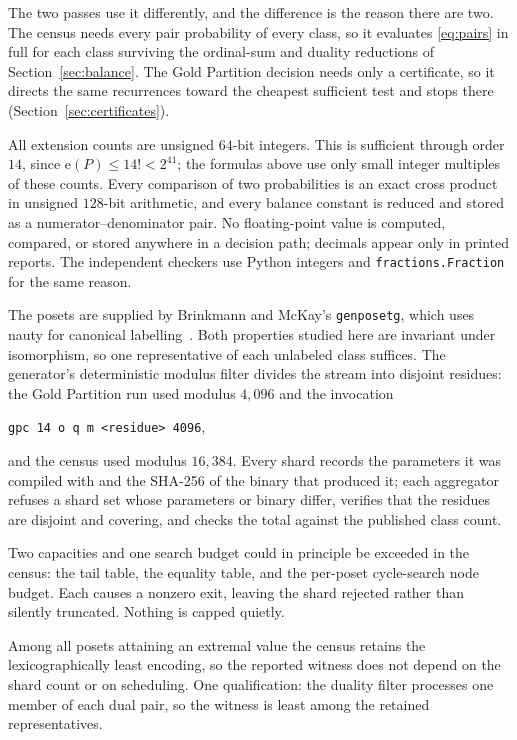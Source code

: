\documentclass[11pt]{article}
\theoremstyle{definition}
\newcommand{\ext}{\mathrm{e}}
\begin{document}
The two passes use it differently, and the difference is the reason there are
two.  The census needs every pair probability of every class, so it evaluates
\eqref{eq:pairs} in full for each class surviving the ordinal-sum and duality
reductions of Section~\ref{sec:balance}.  The Gold Partition decision needs
only a certificate, so it directs the same recurrences toward the cheapest
sufficient test and stops there (Section~\ref{sec:certificates}).

All extension counts are unsigned $64$-bit integers.  This is sufficient
through order $14$, since $\ext(P)\leq14!<2^{41}$; the formulas above use only
small integer multiples of these counts.  Every comparison of two
probabilities is an exact cross product in unsigned $128$-bit arithmetic, and
every balance constant is reduced and stored as a numerator--denominator pair.
No floating-point value is computed, compared, or stored anywhere in a
decision path; decimals appear only in printed reports.  The independent
checkers use Python integers and \texttt{fractions.Fraction} for the same
reason.

The posets are supplied by Brinkmann and McKay's \texttt{genposetg}, which
uses nauty for canonical labelling~\cite{brinkmann-mckay,mckay-piperno}.  Both
properties studied here are invariant under isomorphism, so one representative
of each unlabeled class suffices.  The generator's deterministic modulus filter
divides the stream into disjoint residues: the Gold Partition run used modulus
$4{,}096$ and the invocation
\begin{center}
\verb|gpc 14 o q m <residue> 4096|,
\end{center}
and the census used modulus $16{,}384$.  Every shard records the parameters it
was compiled with and the SHA-256 of the binary that produced it; each
aggregator refuses a shard set whose parameters or binary differ, verifies that
the residues are disjoint and covering, and checks the total against the
published class count.

Two capacities and one search budget could in principle be exceeded in the
census: the tail table, the equality table, and the per-poset cycle-search node
budget.  Each causes a nonzero exit, leaving the shard rejected rather than
silently truncated.  Nothing is capped quietly.

Among all posets attaining an extremal value the census retains the
lexicographically least encoding, so the reported witness does not depend on
the shard count or on scheduling.  One qualification: the duality filter
processes one member of each dual pair, so the witness is least among the
retained representatives.
\end{document}
